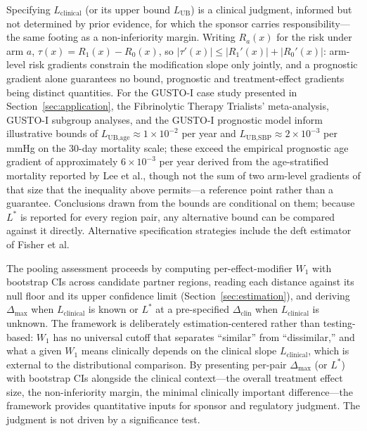 Specifying $L_{\text{clinical}}$ (or its upper bound $L_{\text{UB}}$) is a clinical judgment, informed but not determined by prior evidence, for which the sponsor carries responsibility---the same footing as a non-inferiority margin. Writing $R_a(x)$ for the risk under arm $a$, $\tau(x) = R_1(x) - R_0(x)$, so $|\tau'(x)| \leq |R_1'(x)| + |R_0'(x)|$: arm-level risk gradients constrain the modification slope only jointly, and a prognostic gradient alone guarantees no bound, prognostic and treatment-effect gradients being distinct quantities.\cite{ballman2015,kent2020} For the GUSTO-I case study presented in Section~\ref{sec:application}, the Fibrinolytic Therapy Trialists' meta-analysis\cite{ftt1994}, GUSTO-I subgroup analyses,\cite{gusto1993} and the GUSTO-I prognostic model\cite{lee1995} inform illustrative bounds of $L_{\text{UB,age}} \approx 1 \times 10^{-2}$ per year and $L_{\text{UB,SBP}} \approx 2 \times 10^{-3}$ per mmHg on the 30-day mortality scale; these exceed the empirical prognostic age gradient of approximately $6 \times 10^{-3}$ per year derived from the age-stratified mortality reported by Lee et al.,\cite{lee1995} though not the sum of two arm-level gradients of that size that the inequality above permits---a reference point rather than a guarantee. Conclusions drawn from the bounds are conditional on them; because $L^*$ is reported for every region pair, any alternative bound can be compared against it directly. Alternative specification strategies include the deft estimator of Fisher et al.\cite{fisher2017}

The pooling assessment proceeds by computing per-effect-modifier $W_1$ with bootstrap CIs across candidate partner regions, reading each distance against its null floor and its upper confidence limit (Section~\ref{sec:estimation}), and deriving $\Delta_{\max}$ when $L_{\text{clinical}}$ is known or $L^*$ at a pre-specified $\Delta_{\text{clin}}$ when $L_{\text{clinical}}$ is unknown. The framework is deliberately estimation-centered rather than testing-based: $W_1$ has no universal cutoff that separates ``similar'' from ``dissimilar,'' and what a given $W_1$ means clinically depends on the clinical slope $L_{\text{clinical}}$, which is external to the distributional comparison. By presenting per-pair $\Delta_{\max}$ (or $L^*$) with bootstrap CIs alongside the clinical context---the overall treatment effect size, the non-inferiority margin, the minimal clinically important difference---the framework provides quantitative inputs for sponsor and regulatory judgment. The judgment is not driven by a significance test.\cite{wasserstein2016}


